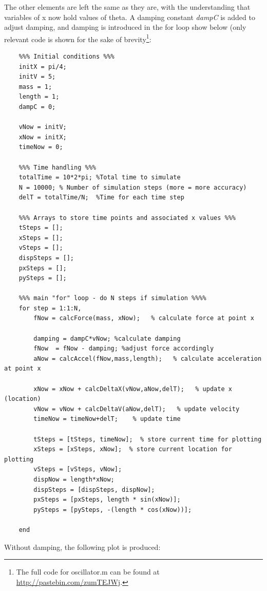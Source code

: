 \documentclass{article}
\begin{document}
The other elements are left the same as they are, with the understanding that variables of x now hold values of theta. A damping constant \emph{dampC} is added to adjust damping, and damping is introduced in the for loop show below (only relevant code is shown for the sake of brevity\footnote{The full code for oscillator.m can be found at \url{http://pastebin.com/zumTEJWj}.}:

\begin{lstlisting}
    %%% Initial conditions %%%
    initX = pi/4;
    initV = 5;
    mass = 1;
    length = 1;
    dampC = 0;

    vNow = initV;
    xNow = initX;
    timeNow = 0;

    %%% Time handling %%%
    totalTime = 10*2*pi; %Total time to simulate
    N = 10000; % Number of simulation steps (more = more accuracy)
    delT = totalTime/N;  %Time for each time step

    %%% Arrays to store time points and associated x values %%%
    tSteps = [];
    xSteps = [];
    vSteps = [];
    dispSteps = [];
    pxSteps = [];
    pySteps = [];
    
    %%% main "for" loop - do N steps if simulation %%%%
    for step = 1:1:N, 
        fNow = calcForce(mass, xNow);   % calculate force at point x
        
        damping = dampC*vNow; %calculate damping
        fNow  = fNow - damping; %adjust force accordingly
        aNow = calcAccel(fNow,mass,length);   % calculate acceleration at point x
        
        xNow = xNow + calcDeltaX(vNow,aNow,delT);   % update x (location)
        vNow = vNow + calcDeltaV(aNow,delT);   % update velocity
        timeNow = timeNow+delT;    % update time
        
        tSteps = [tSteps, timeNow];  % store current time for plotting
        xSteps = [xSteps, xNow];  % store current location for plotting
        vSteps = [vSteps, vNow];
        dispNow = length*xNow;
        dispSteps = [dispSteps, dispNow];
        pxSteps = [pxSteps, length * sin(xNow)];
        pySteps = [pySteps, -(length * cos(xNow))];
      
    end
\end{lstlisting}

Without damping, the following plot is produced:
\end{document}
